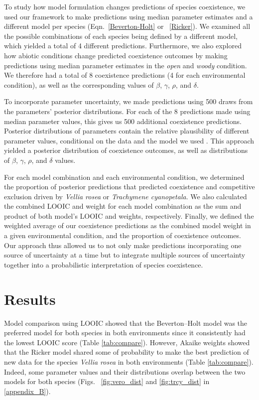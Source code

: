 \begin{refsection}
To study how model formulation changes predictions of species coexistence, we used our framework to make predictions using median parameter estimates and a different model per species (Eqn.~\ref{Beverton-Holt} or ~\ref{Ricker}). We examined all the possible combinations of each species being defined by a different model, which yielded a total of 4 different predictions. Furthermore, we also explored how abiotic conditions change predicted coexistence outcomes by making predictions using median parameter estimates in the \textit{open} and \textit{woody} condition. We therefore had a total of 8 coexistence predictions (4 for each environmental condition), as well as the corresponding values of $\beta$, $\gamma$, $\rho$, and $\delta$.


To incorporate parameter uncertainty, we made predictions using 500 draws from the parameters' posterior distributions. For each of the 8 predictions made using median parameter values, this gives us 500 additional coexistence predictions. Posterior distributions of parameters contain the relative plausibility of different parameter values, conditional on the data and the model we used \citep{mcelreath_statistical_2018}. This approach yielded a posterior distribution of coexistence outcomes, as well as distributions of $\beta$, $\gamma$, $\rho$, and $\delta$ values.

For each model combination and each environmental condition, we determined the proportion of posterior predictions that predicted coexistence and competitive exclusion driven by \textit{Vellia rosea} or \textit{Trachymene cyanopetala}. We also calculated the combined LOOIC and weight for each model combination as the sum and product of both model’s LOOIC and weights, respectively. Finally, we  defined the weighted average of our coexistence predictions as the combined model weight in a given environmental condition, and the proportion of coexistence outcomes. Our approach thus allowed us to not only make predictions incorporating one source of uncertainty at a time but to integrate multiple sources of uncertainty together into a probabilistic interpretation of species coexistence.

\section*{Results}

Model comparison using LOOIC showed that the Beverton--Holt model was the preferred model for both species in both environments since it consistently had the lowest LOOIC score (Table \ref{tab:compare}). However, Akaike weights showed that the Ricker model shared some of probability to make the best prediction of new data for the species \textit{Vellia rosea} in both environments (Table \ref{tab:compare}). Indeed, some parameter values and their distributions overlap between the two models for both species (Figs.~ \ref{fig:vero_dist} and \ref{fig:trcy_dist} in \autoref{appendix_B}).



\end{refsection}
